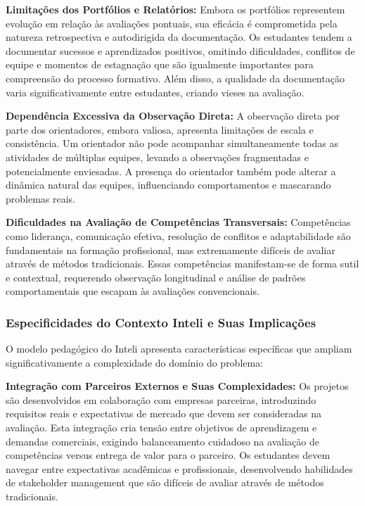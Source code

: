 \documentclass[english, spanish, brazilian]{modelo_dt}
\begin{document}
\textbf{Limitações dos Portfólios e Relatórios:} Embora os portfólios representem evolução em relação às avaliações pontuais, sua eficácia é comprometida pela natureza retrospectiva e autodirigida da documentação. Os estudantes tendem a documentar sucessos e aprendizados positivos, omitindo dificuldades, conflitos de equipe e momentos de estagnação que são igualmente importantes para compreensão do processo formativo. Além disso, a qualidade da documentação varia significativamente entre estudantes, criando vieses na avaliação.

\textbf{Dependência Excessiva da Observação Direta:} A observação direta por parte dos orientadores, embora valiosa, apresenta limitações de escala e consistência. Um orientador não pode acompanhar simultaneamente todas as atividades de múltiplas equipes, levando a observações fragmentadas e potencialmente enviesadas. A presença do orientador também pode alterar a dinâmica natural das equipes, influenciando comportamentos e mascarando problemas reais.

\textbf{Dificuldades na Avaliação de Competências Transversais:} Competências como liderança, comunicação efetiva, resolução de conflitos e adaptabilidade são fundamentais na formação profissional, mas extremamente difíceis de avaliar através de métodos tradicionais. Essas competências manifestam-se de forma sutil e contextual, requerendo observação longitudinal e análise de padrões comportamentais que escapam às avaliações convencionais.

\subsubsection{Especificidades do Contexto Inteli e Suas Implicações}

O modelo pedagógico do Inteli apresenta características específicas que ampliam
significativamente a complexidade do domínio do problema:

\textbf{Integração com Parceiros Externos e Suas Complexidades:} Os projetos são desenvolvidos em colaboração com empresas parceiras, introduzindo requisitos reais e expectativas de mercado que devem ser consideradas na avaliação. Esta integração cria tensão entre objetivos de aprendizagem e demandas comerciais, exigindo balanceamento cuidadoso na avaliação de competências versus entrega de valor para o parceiro. Os estudantes devem navegar entre expectativas acadêmicas e profissionais, desenvolvendo habilidades de stakeholder management que são difíceis de avaliar através de métodos tradicionais.
\end{document}
